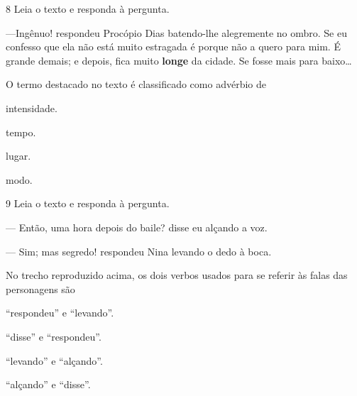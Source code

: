 \num{8} Leia o texto e responda à pergunta.

\begin{myquote}
\textit{}

---Ingênuo! respondeu Procópio Dias batendo-lhe alegremente no ombro.
Se eu confesso que ela não está muito estragada é porque não a quero
para mim. É grande demais; e depois, fica muito \textbf{longe} da cidade.
Se fosse mais para baixo\ldots

\end{myquote}

O termo destacado no texto é classificado como advérbio de

\begin{escolha}
  \item intensidade.

  \item tempo.

  \item lugar.

  \item modo.
\end{escolha}

\pagebreak
\num{9} Leia o texto e responda à pergunta.

\begin{myquote}
\textit{}

--- Então, uma hora depois do baile? disse eu alçando a voz.

--- Sim; mas segredo! respondeu Nina levando o dedo à boca.

\end{myquote}

No trecho reproduzido acima, os dois verbos usados para se referir às
falas das personagens são

\begin{escolha}
  \item ``respondeu'' e ``levando''.

  \item ``disse'' e ``respondeu''.

  \item ``levando'' e ``alçando''.

  \item ``alçando'' e ``disse''.
\end{escolha}

